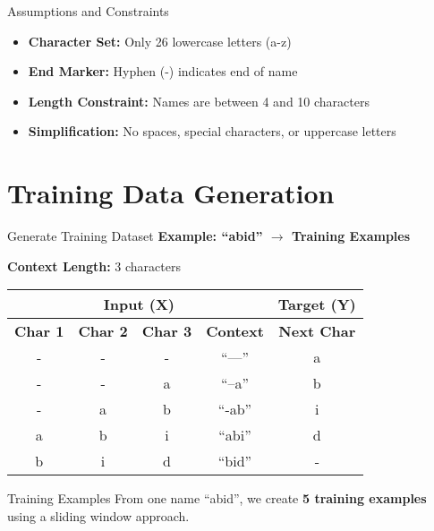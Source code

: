\documentclass[usenames,dvipsnames]{beamer}
\begin{document}
\begin{frame}{Assumptions and Constraints}
\begin{itemize}[<+->]
\item \textbf{Character Set:} Only 26 lowercase letters (a-z)
\item \textbf{End Marker:} Hyphen (-) indicates end of name
\item \textbf{Length Constraint:} Names are between 4 and 10 characters
\item \textbf{Simplification:} No spaces, special characters, or uppercase letters
\end{itemize}

\pause
\vspace{0.5cm}
\begin{center}
\end{center}
\end{frame}

\section{Training Data Generation}

\begin{frame}{Generate Training Dataset}
\textbf{Example: ``abid'' $\rightarrow$ Training Examples}

\vspace{0.5cm}
\textbf{Context Length:} 3 characters

\vspace{0.5cm}
\begin{center}
\begin{tabular}{|c|c|c|c||c|}
\hline
\multicolumn{4}{|c|}{\textbf{Input (X)}} & \textbf{Target (Y)} \\
\hline
\textbf{Char 1} & \textbf{Char 2} & \textbf{Char 3} & \textbf{Context} & \textbf{Next Char} \\
\hline
- & - & - & ``---'' & a \\
- & - & a & ``--a'' & b \\
- & a & b & ``-ab'' & i \\
a & b & i & ``abi'' & d \\
b & i & d & ``bid'' & - \\
\hline
\end{tabular}
\end{center}

\vspace{0.5cm}
\begin{alertblock}{Training Examples}
From one name ``abid'', we create \textbf{5 training examples} using a sliding window approach.
\end{alertblock}
\end{frame}
\end{document}
